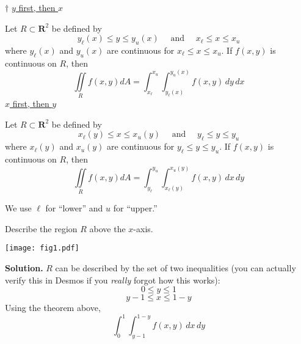 \begin{Theorem}{$ \dagger $}{}
    \underline{$ y $ first, then $ x $}

    Let $ R\subset \mathbf{R}^2 $ be defined by
    \[ y_\ell(x)\le y\le y_u(x)\quad\text{ and }\quad
        x_{\ell}\le x\le x_u \]
    where $ y_{\ell}(x) $ and $ y_u(x) $ are continuous
    for $ x_{\ell}\le x\le x_u $. If $ f(x,y) $
    is continuous on $ R $, then
    \[ \iint\limits_{R}f(x,y)dA=
        \int_{x_\ell}^{x_u} \int_{y_\ell(x)}^{y_u(x)} f(x,y)\, d{y} \, d{x}  \]
    \underline{$ x $ first, then $ y $}

    Let $ R\subset \mathbf{R}^2 $ be defined by
    \[ x_\ell(y)\le x\le x_u(y)\quad\text{ and }\quad
        y_{\ell}\le y\le y_u \]
    where $ x_{\ell}(y) $ and $ x_u(y) $ are continuous
    for $ y_{\ell}\le y\le y_u $. If $ f(x,y) $
    is continuous on $ R $, then
    \[ \iint\limits_{R}f(x,y)dA=
        \int_{y_\ell}^{y_u} \int_{x_\ell(y)}^{x_u(y)} f(x,y)\, d{x} \, d{y}  \]
\end{Theorem}
We use $ \ell $ for ``lower'' and $ u $ for ``upper.''
\begin{Example}{}{}
    Describe the region $ R $ above the $ x $-axis.
    \begin{center}
        \texttt{[image: fig1.pdf]}
    \end{center}
    \textbf{Solution.} $ R $ can be described by the set of two inequalities
    (you can actually verify this in Desmos if you \emph{really} forgot how this works):
    \[ 0\le y\le 1 \]
    \[ y-1\le x\le 1-y \]
    Using the theorem above,
    \[ \int_{0}^{1} \int_{y-1}^{1-y} f(x,y)\, d{x}\, d{y}  \]
\end{Example}
